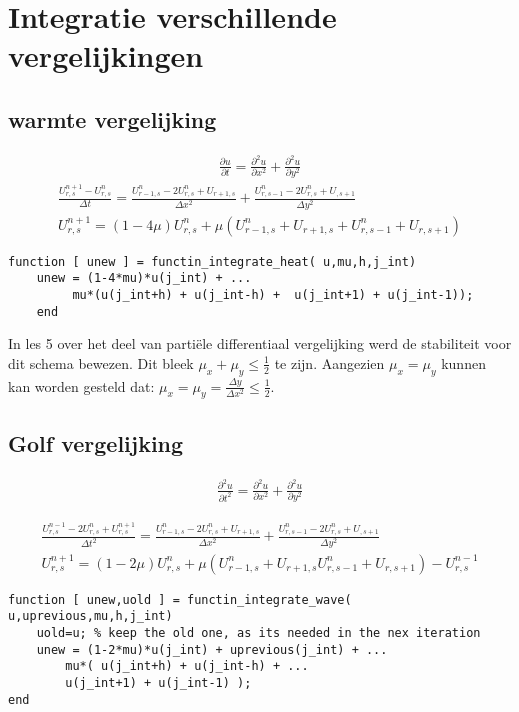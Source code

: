 \documentclass[11pt]{article} %
\begin{document}
\section{Integratie verschillende vergelijkingen}

	\subsection{warmte vergelijking}
		\begin{eqnarray}
			\frac{\partial u}{\partial t} = 
			\frac{\partial ^2 u}{\partial x^2} + 
			\frac{\partial ^2 u}{\partial  y^2} 	
		\end{eqnarray}
		\begin{eqnarray}
			\frac{U_{r,s}^{n+1} - U_{r,s}^n}{\Delta t} =
			\frac{U_{r-1,s}^n - 2 U_{r,s}^n + U_{r+1,s}}{\Delta x^2} + 
			\frac{U_{r,s-1}^n - 2 U_{r,s}^n + U_{,s+1} }{\Delta y^2} \\
			U_{r,s}^{n+1} =( 1-4\mu )U_{r,s}^n + \mu (U_{r-1,s}^n  + U_{r+1,s} + 
			U_{r,s-1}^n  + U_{r,s+1})
		\end{eqnarray}

\begin{lstlisting}[caption=Code Explicit Euler,label={lst:expl_euler}]
function [ unew ] = functin_integrate_heat( u,mu,h,j_int)
	unew = (1-4*mu)*u(j_int) + ... 
	     mu*(u(j_int+h) + u(j_int-h) +  u(j_int+1) + u(j_int-1));
	end
\end{lstlisting}
		In les 5 over het deel van partiële differentiaal vergelijking werd de stabiliteit voor dit schema bewezen. Dit bleek $\mu_x + \mu_y \leq \frac{1}{2}$ te zijn. Aangezien $\mu_x = \mu_y$ kunnen kan worden gesteld dat: $\mu_x=\mu_y=\frac{\Delta y}{\Delta x^2} \leq \frac{1}{2}$.
	\subsection{Golf vergelijking}
		\begin{eqnarray}
		\frac{\partial^2 u}{\partial t^2} = 
		\frac{\partial ^2 u}{\partial x^2} + 
		\frac{\partial ^2 u}{\partial  y^2} 	
		\end{eqnarray}

		\begin{eqnarray}
			\frac{U_{r,s}^{n-1} - 2U_{r,s}^{n}+U_{r,s}^{n+1} }{\Delta t^2} 
			=
			\frac{U_{r-1,s}^n - 2 U_{r,s}^n + U_{r+1,s}}{\Delta x^2} + 
			\frac{U_{r,s-1}^n - 2 U_{r,s}^n + U_{,s+1} }{\Delta y^2} \\
			U_{r,s}^{n+1} = ( 1-2\mu )U_{r,s}^n + \mu (U_{r-1,s}^n  + U_{r+1,s}
			U_{r,s-1}^n  + U_{r,s+1}) - U_{r,s}^{n-1}
		\end{eqnarray}
\begin{lstlisting}[caption=Code Explicit Euler,label={lst:expl_euler}]
function [ unew,uold ] = functin_integrate_wave( u,uprevious,mu,h,j_int)
	uold=u; % keep the old one, as its needed in the nex iteration
	unew = (1-2*mu)*u(j_int) + uprevious(j_int) + ...
		mu*( u(j_int+h) + u(j_int-h) + ...
		u(j_int+1) + u(j_int-1) );
end
\end{lstlisting}
\end{document}

